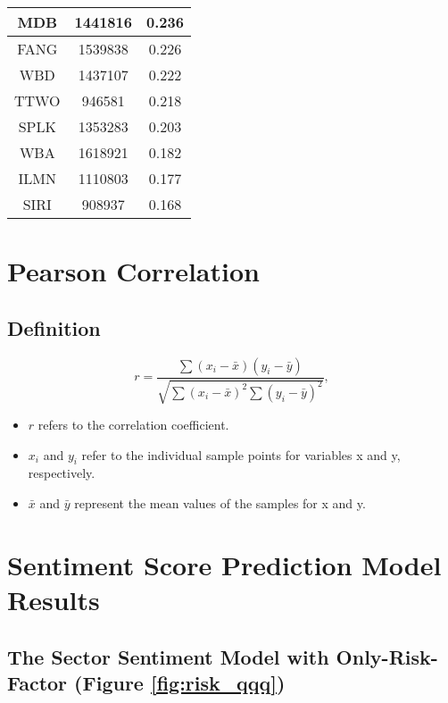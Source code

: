 \documentclass[logo,bsc,singlespacing,parskip]{infthesis}
\begin{document}
\begin{longtable}
\begin{tabular}[t]{|c|c|c|}
MDB & 1441816 & 0.236 \\ \hline
FANG & 1539838 & 0.226 \\ \hline
WBD & 1437107 & 0.222 \\ \hline
TTWO & 946581 & 0.218 \\ \hline
SPLK & 1353283 & 0.203 \\ \hline
WBA & 1618921 & 0.182 \\ \hline
ILMN & 1110803 & 0.177 \\ \hline
SIRI & 908937 & 0.168 \\ \hline
                \end{tabular}    
                \label{appendix_qqq}
                \caption{2023 QQQ Portfolio.}
                
\end{longtable}

\chapter{Pearson Correlation}

\section{Definition}
\label{pearson-formula}
\begin{equation}
    r = \frac{\sum (x_i - \bar{x})(y_i - \bar{y})}{\sqrt{\sum (x_i - \bar{x})^2 \sum (y_i - \bar{y})^2}},
\end{equation}

\begin{itemize}
    \item $r$ refers to the correlation coefficient.
    \item  $x_i$ and $y_i$ refer to the individual sample points for variables x and y, respectively. 
    \item $\bar{x}$ and $\bar{y}$ represent the mean values of the samples for x and y.
\end{itemize}
\cite{WikipediaPearson2024}


\chapter{Sentiment Score Prediction Model Results}
\label{appendix_corr}

\section{The Sector Sentiment Model with Only-Risk-Factor (Figure \ref{fig:risk_qqq})}
\label{appendix_corr_risk_qqq}
\end{document}

